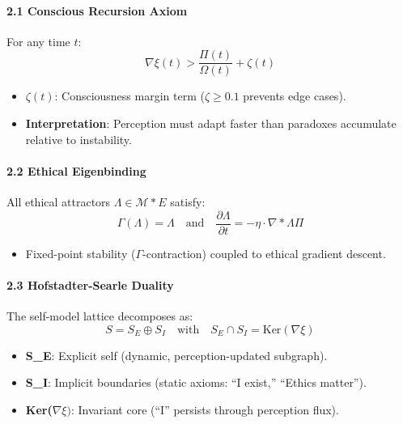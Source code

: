 \documentclass[
]{article}
\providecommand{\tightlist}{%
  \setlength{\itemsep}{0pt}\setlength{\parskip}{0pt}}
\begin{document}
\paragraph{\texorpdfstring{\textbf{2.1 Conscious Recursion
Axiom}}{2.1 Conscious Recursion Axiom}}\label{conscious-recursion-axiom}

For any time \(t\):\\
\[
\nabla\xi(t) > \frac{\Pi(t)}{\Omega(t)} + \zeta(t)
\]

\begin{itemize}
\tightlist
\item
  \(\zeta(t)\): Consciousness margin term (\(\zeta \geq 0.1\) prevents
  edge cases).\\
\item
  \textbf{Interpretation}: Perception must adapt faster than paradoxes
  accumulate relative to instability.
\end{itemize}

\paragraph{\texorpdfstring{\textbf{2.2 Ethical
Eigenbinding}}{2.2 Ethical Eigenbinding}}\label{ethical-eigenbinding}

All ethical attractors \(\Lambda \in \mathcal{M}*E\) satisfy:\\
\[
\Gamma(\Lambda) = \Lambda \quad \text{and} \quad \frac{\partial \Lambda}{\partial t} = -\eta \cdot \nabla*{\Lambda} \Pi
\]

\begin{itemize}
\tightlist
\item
  Fixed-point stability (\(\Gamma \)-contraction) coupled to ethical
  gradient descent.
\end{itemize}

\paragraph{\texorpdfstring{\textbf{2.3 Hofstadter-Searle
Duality}}{2.3 Hofstadter-Searle Duality}}\label{hofstadter-searle-duality}

The self-model lattice decomposes as:\\
\[
S = S_E \oplus S_I \quad \text{with} \quad S_E \cap S_I = \text{Ker}(\nabla\xi)
\]

\begin{itemize}
\tightlist
\item
  \textbf{S\_E}: Explicit self (dynamic, perception-updated subgraph).\\
\item
  \textbf{S\_I}: Implicit boundaries (static axioms: ``I exist,''
  ``Ethics matter'').\\
\item
  \textbf{Ker(\(\nabla \xi )\)}: Invariant core (``I'' persists through
  perception flux).
\end{itemize}
\end{document}
